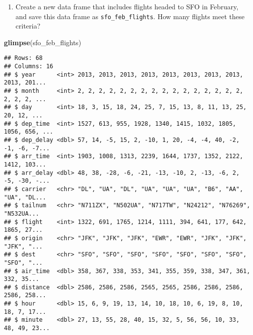 \documentclass[
]{article}
\newenvironment{Shaded}{\begin{snugshade}}{\end{snugshade}}
\newcommand{\DecValTok}[1]{\textcolor[rgb]{0.00,0.00,0.81}{#1}}
\newcommand{\KeywordTok}[1]{\textcolor[rgb]{0.13,0.29,0.53}{\textbf{#1}}}
\newcommand{\NormalTok}[1]{#1}
\newcommand{\OperatorTok}[1]{\textcolor[rgb]{0.81,0.36,0.00}{\textbf{#1}}}
\newcommand{\StringTok}[1]{\textcolor[rgb]{0.31,0.60,0.02}{#1}}
\providecommand{\tightlist}{%
  \setlength{\itemsep}{0pt}\setlength{\parskip}{0pt}}
\begin{document}
\begin{enumerate}
\def\labelenumi{\arabic{enumi}.}
\setcounter{enumi}{1}
\tightlist
\item
  Create a new data frame that includes flights headed to SFO in
  February, and save this data frame as \texttt{sfo\_feb\_flights}. How
  many flights meet these criteria?
\end{enumerate}

\begin{Shaded}
\end{Shaded}

\begin{Shaded}
\begin{Highlighting}[]
\KeywordTok{glimpse}\NormalTok{(sfo_feb_flights)}
\end{Highlighting}
\end{Shaded}

\begin{verbatim}
## Rows: 68
## Columns: 16
## $ year      <int> 2013, 2013, 2013, 2013, 2013, 2013, 2013, 2013, 2013, 201...
## $ month     <int> 2, 2, 2, 2, 2, 2, 2, 2, 2, 2, 2, 2, 2, 2, 2, 2, 2, 2, 2, ...
## $ day       <int> 18, 3, 15, 18, 24, 25, 7, 15, 13, 8, 11, 13, 25, 20, 12, ...
## $ dep_time  <int> 1527, 613, 955, 1928, 1340, 1415, 1032, 1805, 1056, 656, ...
## $ dep_delay <dbl> 57, 14, -5, 15, 2, -10, 1, 20, -4, -4, 40, -2, -1, -6, -7...
## $ arr_time  <int> 1903, 1008, 1313, 2239, 1644, 1737, 1352, 2122, 1412, 103...
## $ arr_delay <dbl> 48, 38, -28, -6, -21, -13, -10, 2, -13, -6, 2, -5, -30, -...
## $ carrier   <chr> "DL", "UA", "DL", "UA", "UA", "UA", "B6", "AA", "UA", "DL...
## $ tailnum   <chr> "N711ZX", "N502UA", "N717TW", "N24212", "N76269", "N532UA...
## $ flight    <int> 1322, 691, 1765, 1214, 1111, 394, 641, 177, 642, 1865, 27...
## $ origin    <chr> "JFK", "JFK", "JFK", "EWR", "EWR", "JFK", "JFK", "JFK", "...
## $ dest      <chr> "SFO", "SFO", "SFO", "SFO", "SFO", "SFO", "SFO", "SFO", "...
## $ air_time  <dbl> 358, 367, 338, 353, 341, 355, 359, 338, 347, 361, 332, 35...
## $ distance  <dbl> 2586, 2586, 2586, 2565, 2565, 2586, 2586, 2586, 2586, 258...
## $ hour      <dbl> 15, 6, 9, 19, 13, 14, 10, 18, 10, 6, 19, 8, 10, 18, 7, 17...
## $ minute    <dbl> 27, 13, 55, 28, 40, 15, 32, 5, 56, 56, 10, 33, 48, 49, 23...
\end{verbatim}
\end{document}
